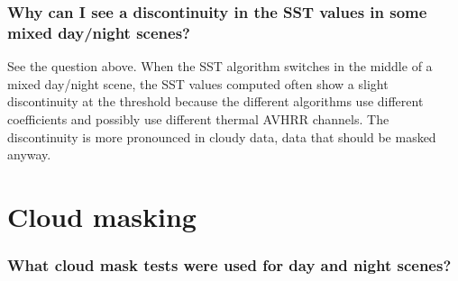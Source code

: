 \subsubsection*{Why can I see a discontinuity in the SST values in some mixed day/night scenes?}

See the question above.  When the SST algorithm switches in the middle
of a mixed day/night scene, the SST values computed often show a
slight discontinuity at the threshold because the different algorithms
use different coefficients and possibly use different thermal AVHRR
channels.  The discontinuity is more pronounced in cloudy data, data
that should be masked anyway.

\section{Cloud masking}

\subsubsection*{What cloud mask tests were used for day and night scenes?}

